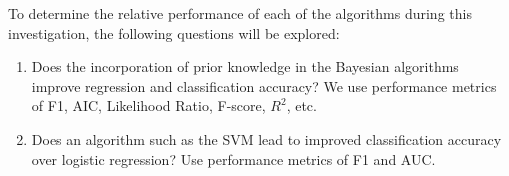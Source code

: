 \documentclass[10pt]{article}
\begin{document}


To determine the relative performance of each of the algorithms during this investigation, the following questions will be explored:

\begin{enumerate}
	\item Does the incorporation of prior knowledge in the Bayesian algorithms improve regression and classification accuracy? We use performance metrics of F1, AIC, Likelihood Ratio, F-score, $R^2$, etc. 
    \item Does an algorithm such as the SVM lead to improved classification accuracy over logistic regression? Use performance metrics of F1 and AUC.
\end{enumerate}

\end{document}
